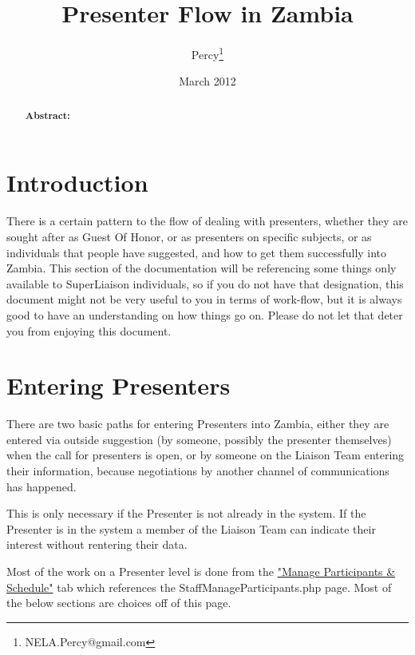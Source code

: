 \documentclass[captions=tablesignature]{scrartcl}
\author{Percy\thanks{NELA.Percy@gmail.com}}
\date{March 2012}
\title{Presenter Flow in Zambia}
\begin{document}
\maketitle
{}
\thispagestyle{fancy}
\renewcommand{\headrulewidth}{0pt}
\renewcommand{\footrulewidth}{0pt}
\lhead{}
\rhead{}
\chead{}
\lfoot{}
\cfoot{}
\rfoot{}
\begin{abstract}
\vspace{5cm}
{\LARGE{\textbf{Abstract:\\}}}

\end{abstract}
\newpage
\renewcommand{\headrulewidth}{1pt}
\renewcommand{\footrulewidth}{1pt}
\rfoot{\thepage}
\setcounter{tocdepth}{3}
\tableofcontents
\listoffigures
\listoftables
\newpage
{}
\section{Introduction}
\label{sec-1}

There is a certain pattern to the flow of dealing with presenters,
whether they are sought after as Guest Of Honor, or as presenters on
specific subjects, or as individuals that people have suggested, and
how to get them successfully into Zambia.  This section of the
documentation will be referencing some things only available to
SuperLiaison individuals, so if you do not have that designation,
this document might not be very useful to you in terms of work-flow,
but it is always good to have an understanding on how things go on.
Please do not let that deter you from enjoying this document.
\section{Entering Presenters}
\label{sec-2}
There are two basic paths for entering Presenters into Zambia,
either they are entered via outside suggestion (by someone, possibly
the presenter themselves) when the call for presenters is open, or
by someone on the Liaison Team entering their information, because
negotiations by another channel of communications has happened.

This is only necessary if the Presenter is not already in the
system.  If the Presenter is in the system a member of the Liaison
Team can indicate their interest without rentering their data.

Most of the work on a Presenter level is done from the \hyperref[sec-2]{"Manage
Participants \& Schedule"} tab which references the
StaffManageParticipants.php page.  Most of the below sections are
choices off of this page.
\end{document}
